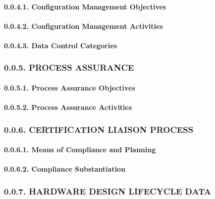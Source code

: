\documentclass[]{article}
\let\oldparagraph\paragraph
\renewcommand{\paragraph}[1]{\oldparagraph{#1}\mbox{}}
\begin{document}
\paragraph{0.0.4.1. Configuration Management
Objectives}\label{configuration-management-objectives}

\paragraph{0.0.4.2. Configuration Management
Activities}\label{configuration-management-activities}

\paragraph{0.0.4.3. Data Control
Categories}\label{data-control-categories}

\subsubsection{0.0.5. PROCESS ASSURANCE}\label{process-assurance}

\paragraph{0.0.5.1. Process Assurance
Objectives}\label{process-assurance-objectives}

\paragraph{0.0.5.2. Process Assurance
Activities}\label{process-assurance-activities}

\subsubsection{0.0.6. CERTIFICATION LIAISON
PROCESS}\label{certification-liaison-process}

\paragraph{0.0.6.1. Means of Compliance and
Planning}\label{means-of-compliance-and-planning}

\paragraph{0.0.6.2. Compliance
Substantiation}\label{compliance-substantiation}

\subsubsection{0.0.7. HARDWARE DESIGN LIFECYCLE
DATA}\label{hardware-design-lifecycle-data}
\end{document}
